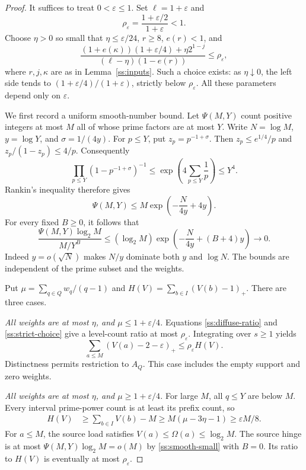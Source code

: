 \begin{proof}
It suffices to treat $0<\varepsilon\le1$.
Set $\ell=1+\varepsilon$ and
\[
 \rho_\varepsilon=\frac{1+\varepsilon/2}{1+\varepsilon}<1.
\]
Choose $\eta>0$ so small that $\eta\le\varepsilon/24$, $r\ge8$,
$e(r)<1$, and
\begin{equation}
 \frac{(1+e(\kappa))(1+\varepsilon/4)+\eta2^{1-j}}
      {(\ell-\eta)(1-e(r))}
 \le\rho_\varepsilon,
 \label{ss:strict-choice}
\end{equation}
where $r,j,\kappa$ are as in Lemma~\ref{ss:inputs}.
Such a choice exists: as $\eta\downarrow0$, the left side tends to
$(1+\varepsilon/4)/(1+\varepsilon)$, strictly below $\rho_\varepsilon$.
All these parameters depend only on $\varepsilon$.

We first record a uniform smooth-number bound. Let $\Psi(M,Y)$ count
positive integers at most $M$ all of whose prime factors are at most $Y$.
Write $N=\log M$, $y=\log Y$, and $\sigma=1/(4y)$.
For $p\le Y$, put $z_p=p^{-1+\sigma}$. Then
$z_p\le e^{1/4}/p$ and $z_p/(1-z_p)\le4/p$. Consequently
\[
 \prod_{p\le Y}(1-p^{-1+\sigma})^{-1}
 \le\exp\left(4\sum_{p\le Y}\frac1p\right)\le Y^4.
\]
Rankin's inequality therefore gives
\begin{equation}
 \Psi(M,Y)\le
 M\exp\left(-\frac{N}{4y}+4y\right).
 \label{ss:smooth-count}
\end{equation}
For every fixed $B\ge0$, it follows that
\begin{equation}
 \frac{\Psi(M,Y)\log_2M}{M/Y^B}
 \le(\log_2M)
       \exp\left(-\frac N{4y}+(B+4)y\right)\longrightarrow0.
 \label{ss:smooth-small}
\end{equation}
Indeed $y=o(\sqrt N)$ makes $N/y$ dominate both $y$ and $\log N$.
The bounds are independent of the prime subset and the weights.

Put $\mu=\sum_{q\in Q}w_q/(q-1)$ and
$H(V)=\sum_{b\in I}(V(b)-1)_+$.
There are three cases.

\emph{All weights are at most $\eta$, and $\mu\le1+\varepsilon/4$.}
Equations \eqref{ss:diffuse-ratio} and \eqref{ss:strict-choice} give
a level-count ratio at most $\rho_\varepsilon$.
Integrating over $s\ge1$ yields
\[
 \sum_{a\le M}(V(a)-2-\varepsilon)_+
 \le\rho_\varepsilon H(V).
\]
Distinctness permits restriction to $A_Q$.
This case includes the empty support and zero weights.

\emph{All weights are at most $\eta$, and $\mu\ge1+\varepsilon/4$.}
For large $M$, all $q\le Y$ are below $M$.
Every interval prime-power count is at least its prefix count, so
\[
 \begin{split}
 H(V)&\ge\sum_{b\in I}V(b)-M
 \ge M(\mu-3\eta-1)
 \ge\varepsilon M/8.
 \end{split}
\]
For $a\le M$, the source load satisfies
$V(a)\le\Omega(a)\le\log_2M$. The source hinge is at most
$\Psi(M,Y)\log_2M=o(M)$ by
\eqref{ss:smooth-small} with $B=0$. Its ratio to $H(V)$ is eventually
at most $\rho_\varepsilon$.


\end{proof}
